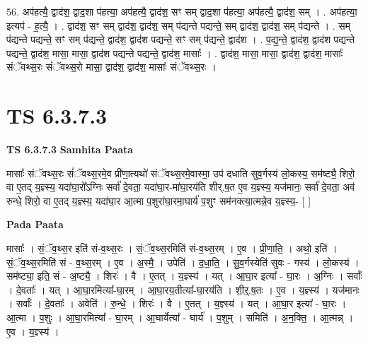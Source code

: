 \documentclass[17pt]{extarticle}
\begin{document}
56. अप॑हत्यै॒ द्वाद॑श॒ द्वाद॒शा प॑हत्या॒ अप॑हत्यै॒ द्वाद॑श॒ सꣳ सम् द्वाद॒शा प॑हत्या॒ अप॑हत्यै॒ द्वाद॑श॒ सम् । . अप॑हत्या॒ इत्यप॑ - ह॒त्यै॒ । . द्वाद॑श॒ सꣳ सम् द्वाद॑श॒ द्वाद॑श॒ सम् प॑द्यन्ते पद्यन्ते॒ सम् द्वाद॑श॒ द्वाद॑श॒ सम् प॑द्यन्ते । . सम् प॑द्यन्ते पद्यन्ते॒ सꣳ सम् प॑द्यन्ते॒ द्वाद॑श॒ द्वाद॑श पद्यन्ते॒ सꣳ सम् प॑द्यन्ते॒ द्वाद॑श । . प॒द्य॒न्ते॒ द्वाद॑श॒ द्वाद॑श पद्यन्ते पद्यन्ते॒ द्वाद॑श॒ मासा॒ मासा॒ द्वाद॑श पद्यन्ते पद्यन्ते॒ द्वाद॑श॒ मासाः᳚ । . द्वाद॑श॒ मासा॒ मासा॒ द्वाद॑श॒ द्वाद॑श॒ मासाः᳚ संॅवथ्स॒रः सं॑ॅवथ्स॒रो मासा॒ द्वाद॑श॒ द्वाद॑श॒ मासाः᳚ संॅवथ्स॒रः । \newline
\pagebreak
{}

\section{ TS 6.3.7.3 }

\textbf{TS 6.3.7.3 } \newline
\textbf{Samhita Paata} \newline

मासाः᳚ संॅवथ्स॒रः सं॑ॅवथ्स॒रमे॒व प्री॑णा॒त्यथो॑ संॅवथ्स॒रमे॒वास्मा॒ उप॑ दधाति सुव॒र्गस्य॑ लो॒कस्य॒ सम॑ष्ट्यै॒ शिरो॒ वा ए॒तद् य॒ज्ञ्स्य॒ यदा॑घा॒रो᳚ऽग्निः सर्वा॑ दे॒वता॒ यदा॑घा॒र-मा॑घा॒रय॑ति शीर्.ष॒त ए॒व य॒ज्ञ्स्य॒ यज॑मानः॒ सर्वा॑ दे॒वता॒ अव॑ रुन्धे॒ शिरो॒ वा ए॒तद् य॒ज्ञ्स्य॒ यदा॑घा॒र आ॒त्मा प॒शुरा॑घा॒रमा॒घार्य॑ प॒शुꣳ सम॑नक्त्या॒त्मन्ने॒व य॒ज्ञ्स्य॒- [  ] \newline

\textbf{Pada Paata} \newline

मासाः᳚ । सं॒ॅव॒थ्स॒र इति॑ सं-व॒थ्स॒रः । सं॒ॅव॒थ्स॒रमिति॑ सं-व॒थ्स॒रम् । ए॒व । प्री॒णा॒ति॒ । अथो॒ इति॑ । सं॒ॅव॒थ्स॒रमिति॑ सं - व॒थ्स॒रम् । ए॒व । अ॒स्मै॒ । उपेति॑ । द॒धा॒ति॒ । सु॒व॒र्गस्येति॑ सुवः - गस्य॑ । लो॒कस्य॑ । सम॑ष्ट्या॒ इति॒ सं - अ॒ष्ट्यै॒ । शिरः॑ । वै । ए॒तत् । य॒ज्ञ्स्य॑ । यत् । आ॒घा॒र इत्या᳚ - घा॒रः । अ॒ग्निः । सर्वाः᳚ । दे॒वताः᳚ । यत् । आ॒घा॒रमित्या᳚-घा॒रम् । आ॒घा॒रय॒तीत्या᳚-घा॒रय॑ति । शी॒र्॒.ष॒तः । ए॒व । य॒ज्ञ्स्य॑ । यज॑मानः । सर्वाः᳚ । दे॒वताः᳚ । अवेति॑ । रु॒न्धे॒ । शिरः॑ । वै । ए॒तत् । य॒ज्ञ्स्य॑ । यत् । आ॒घा॒र इत्या᳚ - घा॒रः । आ॒त्मा । प॒शुः । आ॒घा॒रमित्या᳚ - घा॒रम् । आ॒घार्येत्या᳚ - घार्य॑ । प॒शुम् । समिति॑ । अ॒न॒क्ति॒ । आ॒त्मन्न् । ए॒व । य॒ज्ञ्स्य॑ ।  \newline
\end{document}
